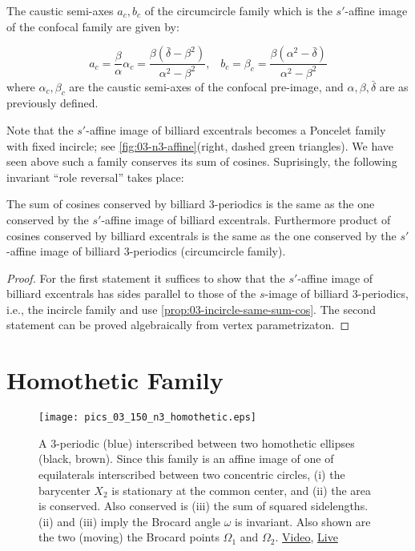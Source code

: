 \begin{lemma}
The caustic semi-axes $a_c,b_c$ of the circumcircle family which is the $s'$-affine image of the confocal family are given by:

\[ a_c=\frac{\beta}{\alpha}{\alpha_c}=\frac{\beta(\bar{\delta}-\beta^2)}{\alpha^2-\beta^2},\;\;\;b_c=\beta_c=\frac{\beta(\alpha^2-\bar{\delta})}{\alpha^2-\beta^2} \]
where $\alpha_c,\beta_c$ are the caustic semi-axes of the confocal pre-image, and $\alpha,\beta,\bar{\delta}$ are as previously defined.
\label{lem:03-circumcircle-affine}
\end{lemma}

\noindent Note that the $s'$-affine image of billiard excentrals becomes a Poncelet family with fixed incircle; see \cref{fig:03-n3-affine}(right, dashed green triangles). We have seen above such a family conserves its sum of cosines. Suprisingly, the following invariant ``role reversal'' takes place:

\begin{proposition}
The sum of cosines conserved by billiard 3-periodics is the same as the one conserved by the $s'$-affine image of billiard excentrals. Furthermore product of cosines conserved by billiard excentrals is the same as the one conserved by the $s'$-affine image of billiard 3-periodics (circumcircle family).   \label{prop:03-n3-role-reversal}
\end{proposition}

\begin{proof}
For the first statement it suffices to show that the $s'$-affine image of billiard excentrals has sides parallel to those of the $s$-image of billiard 3-periodics, i.e., the incircle family and use \cref{prop:03-incircle-same-sum-cos}. The second statement can be proved algebraically from vertex parametrizaton.
\end{proof}

\section{Homothetic Family}
 
\begin{figure}
    \centering
    \texttt{[image: pics\_03\_150\_n3\_homothetic.eps]}
    \caption{A 3-periodic (blue) interscribed between two homothetic ellipses (black, brown). Since this family is an affine image of one of equilaterals interscribed between two concentric circles, (i) the barycenter $X_2$ is stationary at the common center, and (ii) the area is conserved. Also conserved is (iii) the sum of squared sidelengths. (ii) and (iii) imply the Brocard angle $\omega$ is invariant. Also shown are the two (moving) the Brocard points $\Omega_1$ and $\Omega_2$. \href{https://youtu.be/2fvGd8wioZY}{Video}, \href{https://bit.ly/3aYnrVM}{Live}}
    \label{fig:03-homoth-brocard}
\end{figure}

